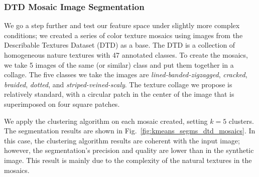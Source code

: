 \subsubsection{DTD Mosaic Image Segmentation}
We go a step further and test our feature space under slightly more complex conditions; we created a series of color texture mosaics using images from the Describable Textures Dataset (DTD) \citep{Cimpoi.Maji.ea:CVPR:2014} as a base. The DTD is a collection of homogeneous nature textures with 47 annotated classes. To create the mosaics, we take 5 images of the same (or similar) class and put them together in a collage. The five classes we take the images are \textit{lined-banded-zigzagged}, \textit{cracked}, \textit{braided}, \textit{dotted}, and \textit{striped-veined-scaly}. The texture collage we propose is relatively standard, with a circular patch in the center of the image that is superimposed on four square patches. 

We apply the clustering algorithm on each mosaic created, setting $ k = 5 $ clusters. The segmentation results are shown in Fig.\ \ref{fig:kmeans_segms_dtd_mosaics}. In this case, the clustering algorithm results are coherent with the input image; however, the segmentation's precision and quality are lower than in the synthetic image. This result is mainly due to the complexity of the natural textures in the mosaics. 

